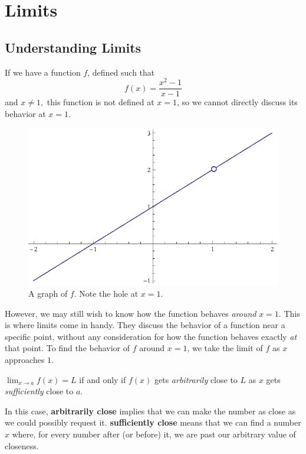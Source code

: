 \chapter{Limits}\label{limits} 
\section{Understanding Limits}
If we have a function \(f\), defined such that
\[f(x)=\frac{x^2-1}{x-1} \]
and \(x \neq 1, \)
this function is not defined at \(x=1\), so we cannot directly discuss its behavior at \(x=1\).
\begin{figure}[h]
  \begin{center}
    \includegraphics[scale=0.7]{graphs/p1ch3x2m1xm1.eps}
  \end{center}
  \caption{A graph of \(f\). Note the hole at \(x=1\).}
\end{figure}
However, we may still wish to know how the function behaves \emph{around} \(x=1\).
This is where limits come in handy.
They discuss the behavior of a function near a specific point, without any consideration for how the function behaves exactly \emph{at} that point.
To find the behavior of \(f\) around \(x=1\), we take the limit of \(f\) as \(x\) approaches \(1\).
\begin{defn}\label{defn:limi}
  \( \lim_{x \to a} f(x) = L \) if and only if \(f(x)\) gets \emph{arbitrarily} close to \( L \) as \(x\) gets \emph{sufficiently} close to \(a\).
\end{defn}
\begin{remark}
  In this case, \textbf{arbitrarily close} implies that we can make the number as close as we could possibly request it. \textbf{sufficiently close} means that we can find a number $x$ where, for every number after (or before) it, we are past our arbitrary value of closeness.
\end{remark}
